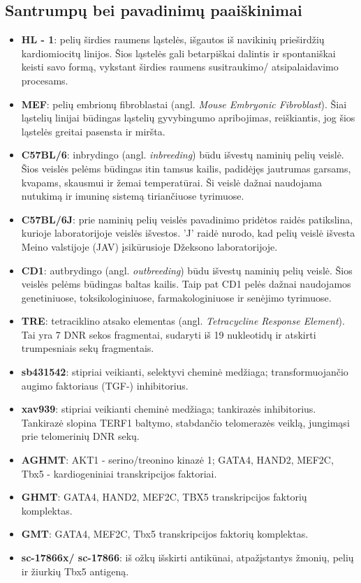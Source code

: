 \documentclass[12pt]{article}
\begin{document}
\subsection{Santrumpų bei pavadinimų paaiškinimai}
\begin{itemize}
    \item \textbf{HL - 1}: pelių širdies raumens ląstelės, išgautos iš
        navikinių prieširdžių kardiomiocitų linijos. Šios ląstelės gali
        betarpiškai dalintis ir spontaniškai keisti savo formą, vykstant
        širdies raumens susitraukimo/ atsipalaidavimo procesams.
    \item \textbf{MEF}: pelių embrionų fibroblastai (angl. \emph{Mouse
        Embryonic Fibroblast}). Šiai ląstelių linijai būdingas ląstelių
        gyvybingumo apribojimas, reiškiantis, jog šios ląstelės greitai
        pasensta ir miršta.
    \item \textbf{C57BL/6}: inbrydingo (angl. \emph{inbreeding}) būdu išvestų
        naminių pelių veislė. Šios veislės pelėms būdingas itin tamsus
        kailis, padidėjęs jautrumas garsams, kvapams, skausmui ir žemai
        temperatūrai. Ši veislė dažnai naudojama nutukimą ir imuninę sistemą
        tiriančiuose tyrimuose.
    \item \textbf{C57BL/6J}: prie naminių pelių veislės pavadinimo pridėtos
        raidės patikslina, kurioje laboratorijoje veislės išvestos. 'J' raidė
        nurodo, kad pelių veislė išvesta Meino valstijoje (JAV) įsikūrusioje
        Džeksono laboratorijoje\cite{JCKSLAB}.
    \item \textbf{CD1}: autbrydingo (angl. \emph{outbreeding}) būdu išvestų
        naminių pelių veislė. Šios veislės pelėms būdingas baltas kailis.
        Taip pat CD1 pelės dažnai naudojamos genetiniuose, toksikologiniuose,
        farmakologiniuose ir senėjimo tyrimuose.
    \item \textbf{TRE}: tetraciklino atsako elementas (angl. \emph{Tetracycline
        Response Element}). Tai yra 7 DNR sekos fragmentai,
        sudaryti iš 19 nukleotidų ir atskirti trumpesniais sekų fragmentais.
    \item \textbf{sb431542}: stipriai veikianti, selektyvi cheminė medžiaga;
        transformuojančio augimo faktoriaus {\textbeta} (TGF-{\textbeta})
        inhibitorius.
    \item \textbf{xav939}: stipriai veikianti cheminė medžiaga; tankirazės
        inhibitorius. Tankirazė slopina TERF1 baltymo, stabdančio
        telomerazės veiklą, jungimąsi prie telomerinių DNR sekų.
    \item \textbf{AGHMT}: AKT1 - serino/treonino kinazė 1; GATA4, HAND2, MEF2C,
        Tbx5 - kardiogeniniai transkripcijos faktoriai.
    \item \textbf{GHMT}: GATA4, HAND2, MEF2C, TBX5 transkripcijos faktorių
        komplektas.
    \item \textbf{GMT}: GATA4, MEF2C, Tbx5 transkripcijos faktorių komplektas.
    \item \textbf{sc-17866x/ sc-17866}: iš ožkų išskirti antikūnai,
        atpažįstantys žmonių, pelių ir žiurkių Tbx5 antigeną.
\end{itemize}
\end{document}
